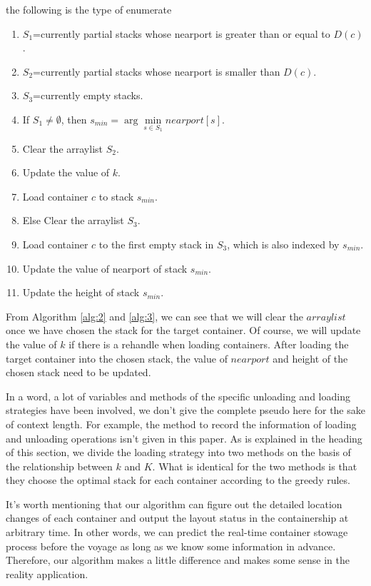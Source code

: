 \documentclass[review,3p,times,authoryear,12pt]{elsarticle}
\begin{document}
 the following is the type of enumerate

\begin{enumerate}[step 1]
\item $S_1$=currently partial stacks whose nearport is greater than or equal to $D(c)$.
\item $S_2$=currently partial stacks whose nearport is smaller than $D(c)$.
\item $S_3$=currently empty stacks.
\item If $S_1\neq \emptyset$, then $s_{min}=\arg\min \limits_{s\in S_1} nearport[s]$.
\item Clear the arraylist $S_2$.
\item Update the value of $k$.
\item Load container $c$ to stack $s_{min}$.
\item Else Clear the arraylist $S_3$.
\item Load container $c$ to the first empty stack in $S_3$, which is also indexed by $s_{min}$.
\item Update the value of nearport of stack $s_{min}$.
\item Update the height of stack $s_{min}$.
\end{enumerate}

From Algorithm \ref{alg:2} and \ref{alg:3}, we can see that we will clear the $arraylist$ once we have chosen the stack for the target container.
Of course, we will update the value of $k$ if there is a rehandle when loading containers.
After loading the target container into the chosen stack, the value of $nearport$ and height of the chosen stack need to be updated.

In a word, a lot of variables and methods of the specific unloading and loading strategies have been involved, we don't give the complete pseudo here for the sake of context length.
For example, the method to record the information of loading and unloading operations isn't given in this paper.
As is explained in the heading of this section, we divide the loading strategy into two methods on the basis of the relationship between $k$ and $K$.
What is identical for the two methods is that they choose the optimal stack for each container according to the greedy rules.

It's worth mentioning that our algorithm can figure out the detailed location changes of each container and output the layout status in the containership at arbitrary time.
In other words, we can predict the real-time container stowage process before the voyage as long as we know some information in advance.
Therefore, our algorithm makes a little difference and makes some sense in the reality application.
\end{document}
